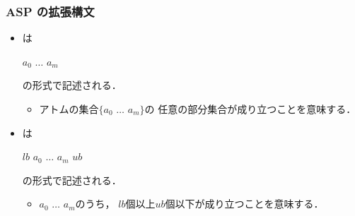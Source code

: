 \documentclass[dvipdfmx,11pt]{beamer}
\begin{document}
\begin{frame}\frametitle{ASP の拡張構文}

  \begin{itemize}
    \item {}は
          \begin{center}
            \code{\{} $a_0$ \code{;} $\dots$ \code{;} $a_{m}$ \code{\}}
          \end{center}
          の形式で記述される．
          \begin{itemize}
            \item アトムの集合$\{ a_0$ \code{,} $\dots$ \code{,} $a_m\}$の
                  任意の部分集合が成り立つことを意味する．
          \end{itemize}
    \item {}は
          \begin{center}
            $lb$ \code{\{} $a_0$ \code{;} $\dots$ \code{;} $a_{m}$ \code{\}} $ub$
          \end{center}
          の形式で記述される．
          \begin{itemize}
            \item $a_0$ \code{,} $\dots$ \code{,} $a_m$のうち，
                  $lb$個以上$ub$個以下が成り立つことを意味する．
          \end{itemize}
  \end{itemize}
  
\end{frame}
\end{document}
